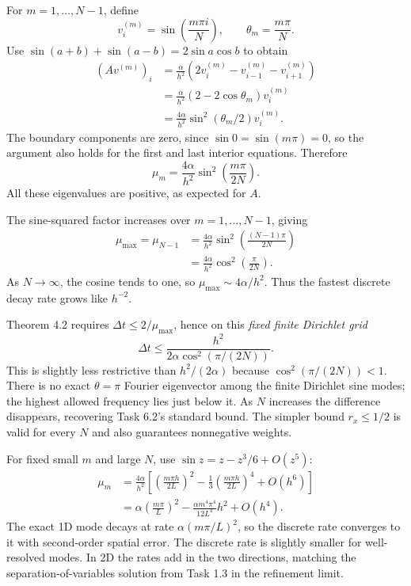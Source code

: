 For $m=1,\ldots,N-1$, define
\[
v_i^{(m)}=\sin\!\left(\frac{m\pi i}{N}\right),\qquad
\theta_m=\frac{m\pi}{N}.
\]
Use $\sin(a+b)+\sin(a-b)=2\sin a\cos b$ to obtain
\begin{align*}
(Av^{(m)})_i
&=\frac{\alpha}{h^2}\left(2v_i^{(m)}-v_{i-1}^{(m)}-v_{i+1}^{(m)}\right)\\
&=\frac{\alpha}{h^2}(2-2\cos\theta_m)v_i^{(m)}\\
&=\frac{4\alpha}{h^2}\sin^2(\theta_m/2)v_i^{(m)}.
\end{align*}
The boundary components are zero, since $\sin0=\sin(m\pi)=0$, so the argument also holds
for the first and last interior equations. Therefore
\[
\boxed{\mu_m=\frac{4\alpha}{h^2}\sin^2\!\left(\frac{m\pi}{2N}\right).}
\]
All these eigenvalues are positive, as expected for $A$.

The sine-squared factor increases over $m=1,\ldots,N-1$, giving
\begin{align*}
\mu_{\max}=\mu_{N-1}
&=\frac{4\alpha}{h^2}\sin^2\!\left(\frac{(N-1)\pi}{2N}\right)\\
&=\boxed{\frac{4\alpha}{h^2}\cos^2\!\left(\frac{\pi}{2N}\right).}
\end{align*}
As $N\to\infty$, the cosine tends to one, so
$\mu_{\max}\sim4\alpha/h^2$. Thus the fastest discrete decay rate grows like $h^{-2}$.

Theorem 4.2 requires $\Delta t\le2/\mu_{\max}$, hence on this \emph{fixed finite Dirichlet grid}
\[
\boxed{\Delta t\le\frac{h^2}{2\alpha\cos^2(\pi/(2N))}.}
\]
This is slightly less restrictive than $h^2/(2\alpha)$ because
$\cos^2(\pi/(2N))<1$. There is no exact $\theta=\pi$ Fourier eigenvector among the
finite Dirichlet sine modes; the highest allowed frequency lies just below it.
As $N$ increases the difference disappears, recovering Task 6.2's standard bound.
The simpler bound $r_x\le1/2$ is valid for every $N$ and also guarantees nonnegative weights.

For fixed small $m$ and large $N$, use $\sin z=z-z^3/6+O(z^5)$:
\begin{align*}
\mu_m
&=\frac{4\alpha}{h^2}\left[
\left(\frac{m\pi h}{2L}\right)^2
-\frac13\left(\frac{m\pi h}{2L}\right)^4+O(h^6)\right]\\
&=\boxed{\alpha\left(\frac{m\pi}{L}\right)^2
-\frac{\alpha m^4\pi^4}{12L^4}h^2+O(h^4).}
\end{align*}
The exact 1D mode decays at rate $\alpha(m\pi/L)^2$, so the discrete rate converges to it
with second-order spatial error. The discrete rate is slightly smaller for well-resolved modes.
In 2D the rates add in the two directions, matching the separation-of-variables solution
from Task 1.3 in the refinement limit.

